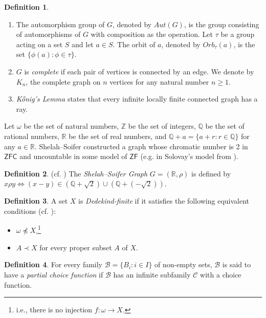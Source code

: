 \documentclass[12pt,reqno,a4paper]{amsart}
\theoremstyle{definition}
\newtheorem{defn}{Definition}[section]
\begin{document}
\begin{defn}
\begin{enumerate}
			\item The automorphism group of $G$, denoted by $Aut(G)$, is the group consisting of automorphisms of $G$ with composition as the operation. Let $\tau$ be a group acting on a set $S$ and let $a\in S$. The orbit of $a$, denoted by $Orb_{\tau}(a)$, is the set $\{\phi(a) : \phi \in \tau\}$.
			
			\item $G$ is {\em complete} if each pair of vertices is connected by an edge. We denote by $K_{n}$, the complete graph on $n$ vertices for any natural number $n\geq 1$.
			
			\item {\em K\H{o}nig’s Lemma} states that every infinite locally finite connected graph has a ray.
		\end{enumerate}
	\end{defn}
	
	Let $\omega$ be the set of natural numbers, $\mathbb{Z}$ be the set of integers, $\mathbb{Q}$ be the set of rational numbers, $\mathbb{R}$ be the set of real numbers, and $\mathbb{Q}+a = \{a + r: r \in \mathbb{Q}\}$ for any $a \in \mathbb{R}$.
	Shelah--Soifer \cite{SS2003} constructed a graph whose chromatic number is 2 in $\mathsf{ZFC}$ and uncountable in some model of $\mathsf{ZF}$ (e.g. in Solovay's model from \cite[Theorem 1]{Sol1970}).
	
	\begin{defn}{(cf. \cite{SS2003})} The {\em Shelah--Soifer Graph} $G = (\mathbb{R},\rho)$ is defined by
		$x\rho y \Leftrightarrow (x-y) \in (\mathbb{Q}+\sqrt{2}) \cup (\mathbb{Q}+ (-\sqrt{2}))$.    
	\end{defn}
	
	
	
	\begin{defn}
		A set $X$ is {\em Dedekind-finite} if it satisfies the following equivalent conditions (cf. \cite[Definition 1]{HT2006}):
		\begin{itemize}
			\item $\omega\not\preceq X$,\footnote{i.e., there is no injection $f:\omega\rightarrow X$.}
			\item  $A \prec X$ for every proper subset $A$ of $X$.
		\end{itemize}
	\end{defn}
	
	\begin{defn}
		For every family $\mathcal{B}=\{B_{i}:i\in I\}$ of non-empty sets, $\mathcal{B}$ is said to have a {\em partial choice function} if  $\mathcal{B}$ has an infinite
		subfamily $\mathcal{C}$ with a choice function.
	\end{defn}
	
\end{document}
